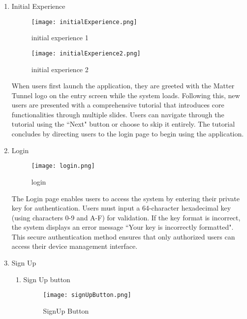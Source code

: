 \documentclass[conference]{IEEEtran}
\begin{document}
\begin{enumerate}[itemsep=2ex, parsep=1ex]
	\item{Initial Experience}

\begin{figure}[h!]
    \centering
    \texttt{[image: initialExperience.png]}
    \caption{initial experience 1}
    \label{fig:enter-label}
\end{figure}

\begin{figure}[h!]
    \centering
    \texttt{[image: initialExperience2.png]}
    \caption{initial experience 2}
    \label{fig:enter-label}
\end{figure}
            
	When users first launch the application, they are greeted with the Matter Tunnel logo on the entry screen while the system loads. Following this, new users are presented with a comprehensive tutorial that introduces core functionalities through multiple slides. Users can navigate through the tutorial using the ``Next" button or choose to skip it entirely. The tutorial concludes by directing users to the login page to begin using the application.
	        
	\item{Login}

    \begin{figure}[h!]
        \centering
        \texttt{[image: login.png]}
        \caption{login}
        \label{fig:enter-label}
    \end{figure}
	        
	The Login page enables users to access the system by entering their private key for authentication. Users must input a 64-character hexadecimal key (using characters 0-9 and A-F) for validation. If the key format is incorrect, the system displays an error message ``Your key is incorrectly formatted". This secure authentication method ensures that only authorized users can access their device management interface.

    \clearpage
	        
	\item{Sign Up}
	\begin{enumerate}
		\item Sign Up button

        \begin{figure}[h!]
            \centering
            \texttt{[image: signUpButton.png]}
            \caption{SignUp Button}
            \label{fig:enter-label}
        \end{figure}
        

\end{enumerate}
\end{enumerate}
\end{document}
